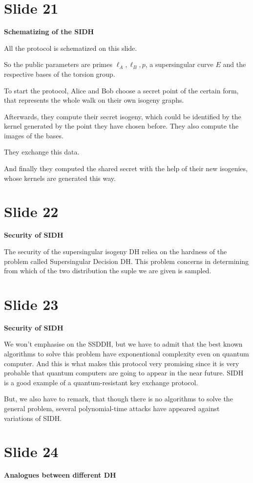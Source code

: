\documentclass[10 pt]{article}
\begin{document}
{\section{Slide 21} \large{\textbf{Schematizing of the SIDH}}

All the protocol is schematized on this slide.

So the public parameters are primes $\ell_A, \ell_B, p$, a supersingular curve $E$ and the respective bases of the torsion group.

To start the protocol, Alice and Bob choose a secret point of the certain form, that represents the whole walk on their own isogeny graphs.

Afterwards, they compute their secret isogeny, which could be identified by the kernel generated by the point they have chosen before. They also compute the images of the bases.

They exchange this data.

And finally they computed the shared secret with the help of their new isogenies, whose kernels are generated this way.

\section{Slide 22} \large{\textbf{Security of SIDH}}

The security of the supersingular isogeny DH reliea on the hardness of the problem called Supersingular Decision DH. This problem concerns in determining from which of the two distribution the suple we are given is sampled.

\section{Slide 23} \large{\textbf{Security of SIDH}}

We won't emphasise on the SSDDH, but we have to admit that the best known algorithms to solve this problem have exponentional complexity even on quantum computer. And this is what makes this protocol very promising since it is very probable that quantum computers are going to appear in the near future. SIDH is a good example of a quantum-resistant key exchange protocol.

But, we also have to remark, that though there is no algorithms to solve the general problem, several polynomial-time attacks have appeared against variations of SIDH.

\section{Slide 24} \large{\textbf{Analogues between different DH}}
	
}
\end{document}
